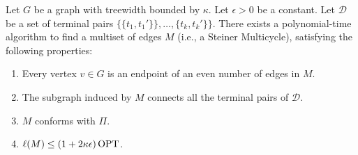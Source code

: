 \begin{theorem}\label{dynamicProgramming}

Let \(G\) be a graph with treewidth bounded by \(\kappa\). Let \(\epsilon > 0\) be a constant. Let \(\mathcal{D}\) be a set of terminal pairs \(\{\{t_1, t_1'\}\}, \dots, \{t_k, t_k'\}\}\).
There exists a polynomial-time algorithm to find a multiset of edges \(M\) (i.e., a Steiner Multicycle), satisfying the following properties:
\begin{enumerate}
    \item Every vertex \(v \in G\) is an endpoint of an even number of edges in \(M\).
    \item The subgraph induced by \(M\) connects all the terminal pairs of \(\mathcal{D}\).
    \item \(M\) conforms with \(\Pi\).
    \item \(\ell(M) \leq (1 + 2 \kappa \epsilon) \operatorname{\textrm{OPT}}\).
\end{enumerate}

\end{theorem}

